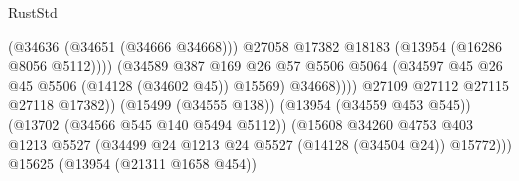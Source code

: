 \begin{lexlean}{RustStd}
\begin{coremodule}
                                                          (@34636 (@34651 (@34666 @34668)))
                                                          @27058
                                                          @17382
                                                          @18183
                                                          (@13954 (@16286 @8056 @5112))))
                                                      (@34589
                                                        @387
                                                        @169
                                                        @26
                                                        @57
                                                        @5506
                                                        @5064
                                                        (@34597
                                                          @45
                                                          @26
                                                          @45
                                                          @5506
                                                          (@14128 (@34602 @45))
                                                          @15569)
                                                        @34668))))
                                                @27109
                                                @27112
                                                @27115
                                                @27118
                                                @17382))
                                            (@15499 (@34555 @138))
                                            (@13954 (@34559 @453 @545))
                                            (@13702 (@34566 @545 @140 @5494 @5112))
                                            (@15608
                                              @34260
                                              @4753
                                              @403
                                              @1213
                                              @5527
                                              (@34499
                                                @24
                                                @1213
                                                @24
                                                @5527
                                                (@14128 (@34504 @24))
                                                @15772)))
                                          @15625
                                          (@13954 (@21311 @1658 @454))

\end{coremodule}
\end{lexlean}
